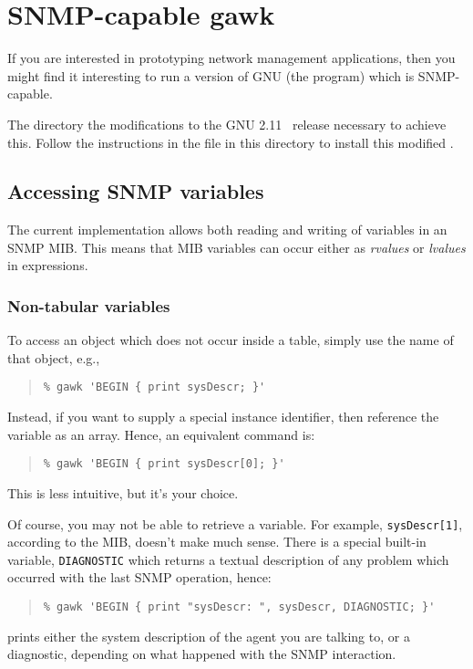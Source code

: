 \section*	{SNMP-capable gawk}
If you are interested in prototyping network management applications,
then you might find it interesting to run a version of GNU 
(the  program) which is SNMP-capable.

The directory  the modifications to the GNU
 2.11~ release necessary to achieve this.
Follow the instructions in the  file in this directory to
install this modified .

\subsection*	{Accessing SNMP variables}
The current implementation allows both reading and writing of variables in an
SNMP MIB.
This means that MIB variables can occur either as {\em rvalues} or
{\em lvalues} in expressions.

\subsubsection*	{Non-tabular variables}
To access an object which does not occur inside a table,
simply use the name of that object, e.g.,
\begin{quote}\small\begin{verbatim}
% gawk 'BEGIN { print sysDescr; }'
\end{verbatim}\end{quote}
Instead,
if you want to supply a special instance identifier,
then reference the variable as an array.
Hence,
an equivalent command is:
\begin{quote}\small\begin{verbatim}
% gawk 'BEGIN { print sysDescr[0]; }'
\end{verbatim}\end{quote}
This is less intuitive,
but it's your choice.

Of course,
you may not be able to retrieve a variable.
For example, \verb"sysDescr[1]", according to the MIB,
doesn't make much sense.
There is a special built-in variable,
\verb"DIAGNOSTIC" which returns a textual description of any problem which
occurred with the last SNMP operation,
hence:
\begin{quote}\small\begin{verbatim}
% gawk 'BEGIN { print "sysDescr: ", sysDescr, DIAGNOSTIC; }'
\end{verbatim}\end{quote}
prints either the system description of the agent you are talking to,
or a diagnostic,
depending on what happened with the SNMP interaction.

